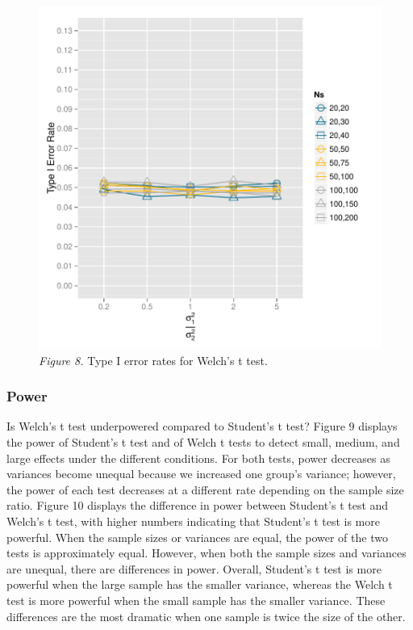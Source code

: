 \documentclass[man,a4paper,noextraspace,apacite]{apa6}
\begin{document}
\begin{figure}
\includegraphics{WelchManuscript-MASTER-Type1WelchPlot}
\textit{Figure 8.} Type I error rates for Welch's t test.
\end{figure}

\subsubsection{Power}



    Is Welch's t test underpowered compared to Student's t test? Figure 9 displays the power of Student's t test and of Welch t tests to detect small, medium, and large effects under the different conditions. For both tests, power decreases as variances become unequal because we increased one group's variance; however, the power of each test decreases at a different rate depending on the sample size ratio. Figure 10 displays the difference in power between Student's t test and Welch's t test, with higher numbers indicating that Student's t test is more powerful. When the sample sizes or variances are equal, the power of the two tests is approximately equal. However, when both the sample sizes and variances are unequal, there are differences in power. Overall, Student's t test is more powerful when the large sample has the smaller variance, whereas the Welch t test is more powerful when the small sample has the smaller variance. These differences are the most dramatic when one sample is twice the size of the other. 
    
\end{document}
